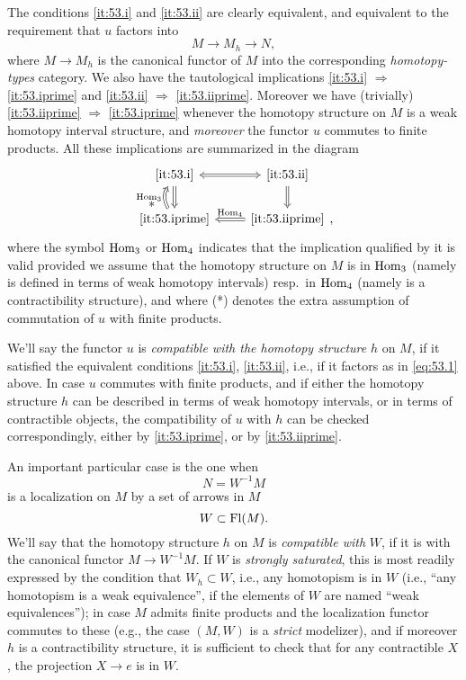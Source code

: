 The conditions \ref{it:53.i} and \ref{it:53.ii} are clearly
equivalent, and equivalent to the requirement that $u$ factors into
\begin{equation}
  \label{eq:53.1}
  M \to M_h \to N,\tag{1}
\end{equation}
where $M\to M_h$ is the canonical functor of $M$ into the
corresponding \emph{homotopy-types} category. We also have the
tautological implications \ref{it:53.i} $\Rightarrow$
\ref{it:53.iprime} and \ref{it:53.ii} $\Rightarrow$
\ref{it:53.iiprime}. Moreover we have (trivially) \ref{it:53.iiprime}
$\Rightarrow$ \ref{it:53.iprime} whenever the homotopy structure on
$M$ is a weak homotopy interval structure, and \emph{moreover} the
functor $u$ commutes to finite products. All these implications are
summarized in the diagram
\[\begin{tikzcd}[baseline=(O.base),math mode=false,%
  arrows=Rightarrow]
  \ref{it:53.i} \ar[r,Leftrightarrow]\ar[d] &
  \ref{it:53.ii} \ar[d] \\
  \ref{it:53.iprime} \ar[u,bend left,"*\;\;" pos=0.45, "$\Hom_3$"] &
  |[alias=O]| \ref{it:53.iiprime} \ar[l,swap,"$\Hom_4$"]
\end{tikzcd},\]
where the symbol $\operatorname{Hom}_3$ or $\operatorname{Hom}_4$ indicates that the implication
qualified by it is valid provided we assume that the homotopy
structure on $M$ is in $\operatorname{Hom}_3$ (namely is defined in terms of weak
homotopy intervals) resp.\ in $\operatorname{Hom}_4$ (namely is a contractibility
structure), and where (*) denotes the extra assumption of commutation
of $u$ with finite products.

We'll say the functor $u$ is \emph{compatible with the
  homotopy structure} $h$ on $M$, if it satisfied the equivalent
conditions \ref{it:53.i}, \ref{it:53.ii}, i.e., if it factors as in
\eqref{eq:53.1} above. In case $u$ commutes with finite products, and
if either the homotopy structure $h$ can be described in terms of weak
homotopy intervals, or in terms of contractible objects, the
compatibility of $u$ with $h$ can be checked correspondingly, either
by \ref{it:53.iprime}, or by \ref{it:53.iiprime}.

\label{sec:54}%
An important particular case is the one when
\[N = W^{-1}M\]
is a localization on $M$ by a set of arrows in $M$
\[W\subset \operatorname{Fl}(M).\]
We'll say that the homotopy structure $h$ on $M$ is \emph{compatible
  with} $W$, if it is with the canonical functor $M\to W^{-1}M$. If
$W$ is \emph{strongly saturated}, this is most readily expressed by
the condition that $W_h\subset W$, i.e., any homotopism is in $W$
(i.e., ``any homotopism is a weak equivalence'', if the elements of
$W$ are named ``weak equivalences''); in case $M$ admits finite
products and the localization functor commutes to these (e.g., the
case $(M,W)$ is a \emph{strict} modelizer), and if moreover $h$ is a
contractibility structure, it is sufficient to check that for any
contractible $X$, the projection $X\to e$ is in $W$.

